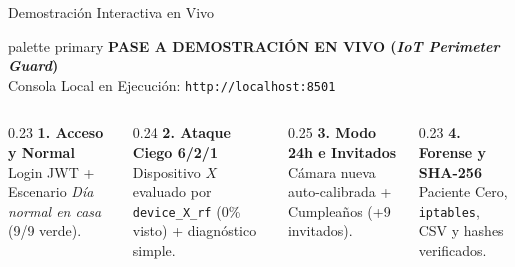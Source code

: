 \documentclass[aspectratio=169, 10pt]{beamer}
\begin{document}
\begin{frame}{Demostración Interactiva en Vivo}
  \centering
  \vspace{2mm}
  \begin{beamercolorbox}[rounded=true,center,sep=3.5mm,wd=0.84\textwidth]{palette primary}
    {\Large \textbf{PASE A DEMOSTRACIÓN EN VIVO (\textit{IoT Perimeter Guard})}}\\[2mm]
    {\small Consola Local en Ejecución: \texttt{http://localhost:8501}}
  \end{beamercolorbox}
  \vspace{5mm}
  \begin{columns}[T]
    \begin{column}{0.23\textwidth}
      \centering
      \textbf{1. Acceso y Normal}\\
      \scriptsize Login JWT + Escenario \textit{Día normal en casa} (9/9 verde).
    \end{column}
    \begin{column}{0.24\textwidth}
      \centering
      \textbf{2. Ataque Ciego 6/2/1}\\
      \scriptsize Dispositivo $X$ evaluado por \texttt{device\_X\_rf} (0\% visto) + diagnóstico simple.
    \end{column}
    \begin{column}{0.25\textwidth}
      \centering
      \textbf{3. Modo 24h e Invitados}\\
      \scriptsize Cámara nueva auto-calibrada + Cumpleaños (+9 invitados).
    \end{column}
    \begin{column}{0.23\textwidth}
      \centering
      \textbf{4. Forense y SHA-256}\\
      \scriptsize Paciente Cero, \texttt{iptables}, CSV y hashes verificados.
    \end{column}
  \end{columns}
\end{frame}
\end{document}
